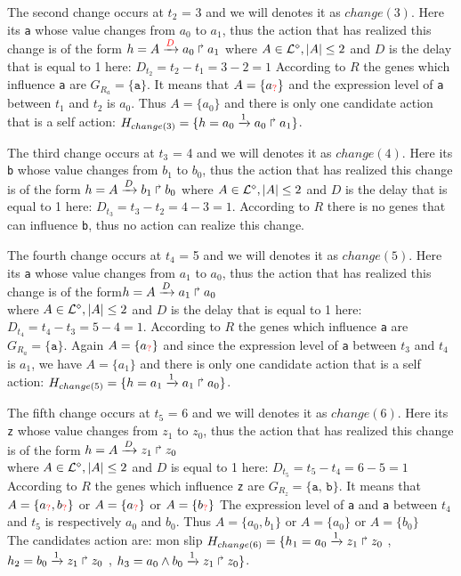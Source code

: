 The second change occurs at $t_2$ = 3 and we will denotes it as $change(3)$.
Here its \texttt{a} whose value changes from $a_0$ to $a_1$, thus the action that has realized this change is of the form
$h = A\xrightarrow{\textcolor{red}{D}} a_0 \Rsh a_1$ 
where $ A \in \mathcal{L}^{\diamond}, | A| \leq 2$ and $D$ is the delay that is equal to 1 here: 
$D_{t_2}= t_2 - t_1 = 3 - 2= 1$
According to $R$ the genes which influence \texttt{a} are $G_{R_a} = \{\texttt{a}\}$.
It means that $A= \{ a_{\textcolor{red}{?}}\}$ and the expression level of \texttt{a} between $t_1$ and $t_{2}$ is $a_0$.
Thus  $A= \{ a_0\} $ and there is only one candidate action that is a self action:
$H_{change(3)} = \{ h=a_0\xrightarrow{1} a_0 \Rsh a_1  \}$.

The third change occurs at $t_3$ = 4 and we will denotes it as $change(4)$.
Here its \texttt{b} whose value changes from $b_1$ to $b_0$, thus the action that has realized this change is of the form 
$h = A\xrightarrow{D} b_1 \Rsh b_0$ where $ A \in \mathcal{L}^{\diamond}, | A| \leq 2$ and $D$ is the delay that is equal to 1 here:
$D_{t_3}= t_3 - t_2 = 4 - 3 = 1$.
According to $R$ there is no genes that can influence \texttt{b}, thus no action can realize this change.

The fourth change occurs at $t_4$ = 5 and we will denotes it as $change(5)$.
Here its \texttt{a} whose value changes from $a_1$ to $a_0$, thus the action that has realized this change is of the form$h = A\xrightarrow{D} a_1 \Rsh a_0$ \\
where $ A \in \mathcal{L}^{\diamond}, | A| \leq 2$ and $D$ is the delay that is equal to 1 here:
$D_{t_4}= t_4 - t_3 = 5 - 4= 1$.
According to $R$ the genes which influence \texttt{a} are $G_{R_a} = \{\texttt{a}\}$.
Again $A= \{ a_{\textcolor{red}{?}}\}$ and since the expression level of \texttt{a} between $t_3$ and $t_{4}$ is $a_1$,
we have $A= \{ a_1\} $ and there is only one candidate action that is a self action:
$H_{change(5)} = \{ h=a_1\xrightarrow{1} a_1 \Rsh a_0 \}$.

The fifth change occurs at $t_5$ = 6 and we will denotes it as $change(6)$.
Here its \texttt{z} whose value changes from $z_1$ to $z_0$, thus the action that has realized this change is of the form 
$h = A\xrightarrow{D} z_1 \Rsh z_0$ \\
where $ A \in \mathcal{L}^{\diamond}, |A| \leq 2$ and $D$ is equal to 1 here:
$D_{t_5}= t_5 - t_4 = 6 - 5= 1$ \\
According to $R$ the genes which influence \texttt{z} are $G_{R_z} = \{\texttt{a, b}\}$.
It means that $A= \{ a_{\textcolor{red}{?}}, b_{\textcolor{red}{?}} \} $ or $A= \{ a_{\textcolor{red}{?}} \} $ or $A= \{ b_{\textcolor{red}{?}} \} $
The expression level of \texttt{a} and \texttt{a} between $t_4$ and $t_{5}$ is respectively $a_0$ and $b_0$.
Thus $A= \{ a_0, b_1 \} $ or $A= \{ a_0\} $ or $A= \{ b_0 \} $ \\
The candidates action are: mon slip
$H_{change(6)} = \{ h_1=a_0\xrightarrow{1} z_1 \Rsh z_0$
, $  h_2=b_0\xrightarrow{1} z_1 \Rsh z_0$
, $  h_3=a_0 \wedge b_0 \xrightarrow{1} z_1 \Rsh z_0 \}$.

